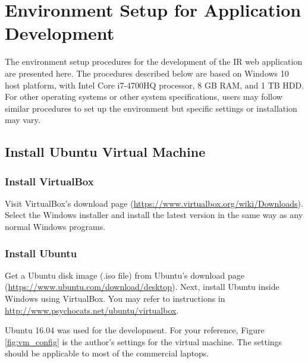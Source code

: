 \chapter{Environment Setup for Application Development}
\label{appendix:env_setup}

The environment setup procedures for the development of the IR web application are presented here. The procedures described below are based on Windows 10 host platform, with Intel Core i7-4700HQ processor, 8 GB RAM, and 1 TB HDD. For other operating systems or other system specifications, users may follow similar procedures to set up the environment but specific settings or installation may vary.

\section{Install Ubuntu Virtual Machine}
\subsection{Install VirtualBox} 
Visit VirtualBox's download page (\url{https://www.virtualbox.org/wiki/Downloads}).  Select the Windows installer and install the latest version in the same way as any normal Windows programs.

\subsection{Install Ubuntu} 
Get a Ubuntu disk image (.iso file) from Ubuntu's download page (\url{https://www.ubuntu.com/download/desktop}). Next, install Ubuntu inside Windows using VirtualBox. You may refer to instructions in \url{http://www.psychocats.net/ubuntu/virtualbox}.

Ubuntu 16.04 was used for the development. For your reference, Figure \ref{fig:vm_config} is the author's settings for the virtual machine. The settings should be applicable to most of the commercial laptops.

